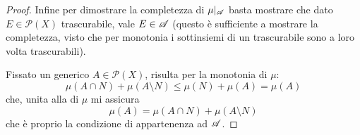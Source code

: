 \begin{proof}
	Infine per dimostrare la completezza di $\mu|_{\mathscr A}$ basta mostrare che dato $E\in\mathcal P(X)$ trascurabile, vale $E\in\mathscr A$ (questo è sufficiente a mostrare la completezza, visto che per monotonia i sottinsiemi di un trascurabile sono a loro volta trascurabili).
	
	Fissato un generico $A\in\mathcal P(X)$, risulta per la monotonia di $\mu$:
	\begin{equation*}
		\mu(A\cap N)+\mu(A\setminus N)\le \mu(N)+\mu(A)=\mu(A)
	\end{equation*}
	che, unita alla \sigsubadd[ità] di $\mu$ mi assicura
	\begin{equation*}
		\mu(A)=\mu(A\cap N)+\mu(A\setminus N)
	\end{equation*}
	che è proprio la condizione di appartenenza ad $\mathscr A$.
\end{proof}

